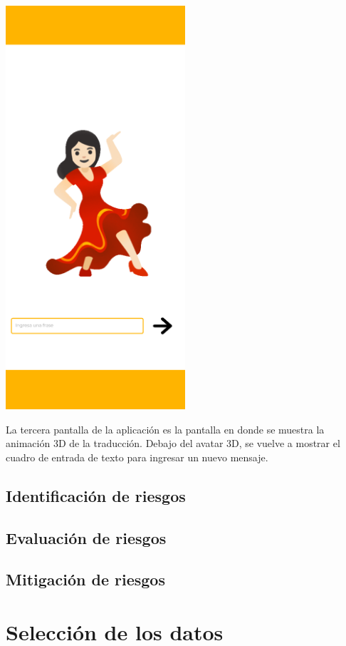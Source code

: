 \begin{center}
    \includegraphics[width=0.5\textwidth]{Images/Cap 3/Pantalla3.png}
\end{center}

La tercera pantalla de la aplicación es la pantalla en donde se muestra la animación 3D de la traducción. Debajo del avatar 3D, se vuelve a mostrar el cuadro de entrada de texto para ingresar un nuevo mensaje.

\subsection{Identificación de riesgos}
\subsection{Evaluación de riesgos}
\subsection{Mitigación de riesgos}

\section{Selección de los datos}
